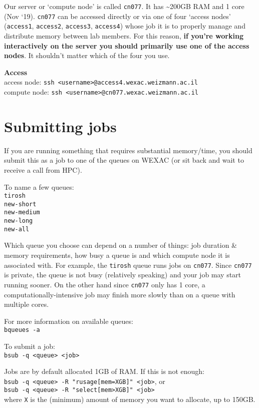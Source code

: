 \documentclass[]{book}
\begin{document}
Our server or `compute node' is called \texttt{cn077}. It has
\textasciitilde{}200GB RAM and 1 core (Nov `19). \texttt{cn077} can be
accessed directly or via one of four `access nodes' (\texttt{access1},
\texttt{access2}, \texttt{access3}, \texttt{access4}) whose job it is to
properly manage and distribute memory between lab members. For this
reason, \textbf{if you're working interactively on the server you should
primarily use one of the access nodes}. It shouldn't matter which of the
four you use.

\textbf{Access}\\
access node:
\texttt{ssh\ \textless{}username\textgreater{}@access4.wexac.weizmann.ac.il}\\
compute node:
\texttt{ssh\ \textless{}username\textgreater{}@cn077.wexac.weizmann.ac.il}

\section{Submitting jobs}\label{submitting-jobs}

If you are running something that requires substantial memory/time, you
should submit this as a job to one of the queues on WEXAC (or sit back
and wait to receive a call from HPC).

To name a few queues:\\
\texttt{tirosh}\\
\texttt{new-short}\\
\texttt{new-medium}\\
\texttt{new-long}\\
\texttt{new-all}

Which queue you choose can depend on a number of things: job duration \&
memory requirements, how busy a queue is and which compute node it is
associated with. For example, the \texttt{tirosh} queue runs jobs on
\texttt{cn077}. Since \texttt{cn077} is private, the queue is not busy
(relatively speaking) and your job may start running sooner. On the
other hand since \texttt{cn077} only has 1 core, a
computationally-intensive job may finish more slowly than on a queue
with multiple cores.

For more information on available queues:\\
\texttt{bqueues\ -a}

To submit a job:\\
\texttt{bsub\ -q\ \textless{}queue\textgreater{}\ \textless{}job\textgreater{}}

Jobs are by default allocated 1GB of RAM. If this is not enough:\\
\texttt{bsub\ -q\ \textless{}queue\textgreater{}\ -R\ "rusage{[}mem=XGB{]}"\ \textless{}job\textgreater{}},
or\\
\texttt{bsub\ -q\ \textless{}queue\textgreater{}\ -R\ "select{[}mem\textgreater{}XGB{]}"\ \textless{}job\textgreater{}}\\
where \texttt{X} is the (minimum) amount of memory you want to allocate,
up to 150GB.
\end{document}
